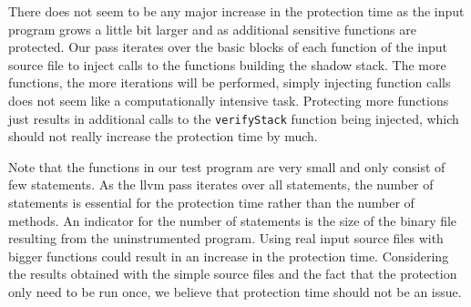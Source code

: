 \documentclass{llncs}
\begin{document}
There does not seem to be any major increase in the protection time as the input program grows a little bit larger and as additional sensitive functions are protected. Our pass iterates over the basic blocks of each function of the input source file to inject calls to the functions building the shadow stack. The more functions, the more iterations will be performed, simply injecting function calls does not seem like a computationally intensive task. Protecting more functions just results in additional calls to the \texttt{verifyStack} function being injected, which should not really increase the protection time by much.

Note that the functions in our test program are very small and only consist of few statements. As the llvm pass iterates over all statements, the number of statements is essential for the protection time rather than the number of methods. An indicator for the number of statements is the size of the binary file resulting from the uninstrumented program. Using real input source files with bigger functions could result in an increase in the protection time. Considering the results obtained with the simple source files and the fact that the protection only need to be run once, we believe that protection time should not be an issue.

\begin{table}
  \centering {}
  \caption{Protection time for different programs}
  \label{table:protectionTime}
\end{table}
\end{document}
